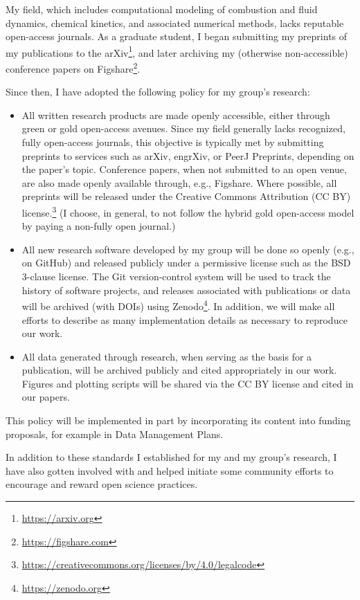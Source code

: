 \documentclass[nobib]{tufte-handout}
\begin{document}
My field, which includes computational modeling of combustion and fluid dynamics,
chemical kinetics, and associated numerical methods, lacks reputable open-access
journals. As a graduate student, I began submitting my preprints of my publications
to the arXiv\footnote{\url{https://arxiv.org}}, and later archiving my
(otherwise non-accessible) conference papers on
Figshare\footnote{\url{https://figshare.com}}.

Since then, I have adopted the following policy for my group's research:
\begin{itemize}
    \item All written research products are made openly accessible, either through
    green or gold open-access avenues. Since my field generally lacks recognized,
    fully open-access journals, this objective is typically met by submitting
    preprints to services such as arXiv, engrXiv, or PeerJ Preprints, depending
    on the paper's topic. Conference papers, when not submitted to an open venue,
    are also made openly available through, e.g., Figshare. Where possible, all
    preprints will be released under the Creative Commons Attribution (CC BY)
    license.\footnote{\url{https://creativecommons.org/licenses/by/4.0/legalcode}}
    (I choose, in general, to not follow the hybrid gold open-access model by
    paying a non-fully open journal.)

    \item All new research software developed by my group will be done so openly
    (e.g., on GitHub) and released publicly under a permissive license such as
    the BSD 3-clause license. The Git version-control system will be used to
    track the history of software projects, and releases associated with
    publications or data will be archived (with DOIs) using
    Zenodo\footnote{\url{https://zenodo.org}}.
    In addition, we will make all efforts to describe as many implementation
    details as necessary to reproduce our work.

    \item All data generated through research, when serving as the basis for
    a publication, will be archived publicly and cited appropriately in our
    work. Figures and plotting scripts will be shared via the CC BY license
    and cited in our papers.
\end{itemize}
This policy will be implemented in part by incorporating its content into
funding proposals, for example in Data Management Plans.

In addition to these standards I established for my and my group's research, I
have also gotten involved with and helped initiate some community efforts to
encourage and reward open science practices.
\end{document}
